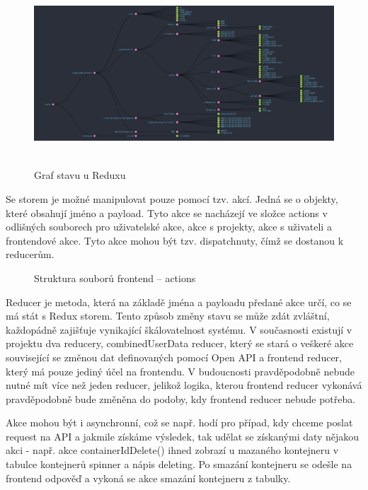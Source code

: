 \documentclass[a4paper,oneside,12pt]{report}
\begin{document}
\begin{figure}[h]
	\centering
	\includegraphics[height=6.9cm]{../img/Redux.png}
	\caption[Graf stavu u reduxu, vlastní tvorba, vygenerováno pomocí redux dev tools ]{Graf stavu u Reduxu}
	\label{fig:redux}
\end{figure}


Se storem je možné manipulovat pouze pomocí tzv. akcí.
Jedná se o objekty, které obsahují jméno a payload.
Tyto akce se nacházejí ve složce actions v odlišných souborech pro uživatelské akce, akce s projekty, akce s uživateli a frontendové akce.
Tyto akce mohou být tzv. dispatchnuty, čímž se dostanou k reducerům.

\begin{figure}[h]
	\caption[Struktura souborů frontendu -- actions, vlastní tvorba]{Struktura souborů frontend -- actions}
	\label{fig:frontendStructureSrc}
\end{figure}


Reducer je metoda, která na základě jména a payloadu předané akce určí, co se má stát s Redux storem.
Tento způsob změny stavu se může zdát zvláštní, každopádně zajišťuje vynikající škálovatelnost systému.
V současnosti existují v projektu dva reducery, combinedUserData reducer, který se stará o veškeré akce související se změnou dat definovaných pomocí Open API a frontend reducer, který má pouze jediný účel na frontendu.
V budoucnosti pravděpodobně nebude nutné mít více než jeden reducer, jelikož logika, kterou frontend reducer vykonává pravděpodobně bude změněna do podoby, kdy frontend reducer nebude potřeba.

Akce mohou být i asynchronní, což se např. hodí pro případ, kdy chceme poslat request na API a jakmile získáme výsledek, tak udělat se získanými daty nějakou akci - např. akce containerIdDelete() ihned zobrazí u mazaného kontejneru v tabulce kontejnerů spinner a nápis deleting.
Po smazání kontejneru se odešle na frontend odpověď a vykoná se akce smazání kontejneru z tabulky.
\end{document}
